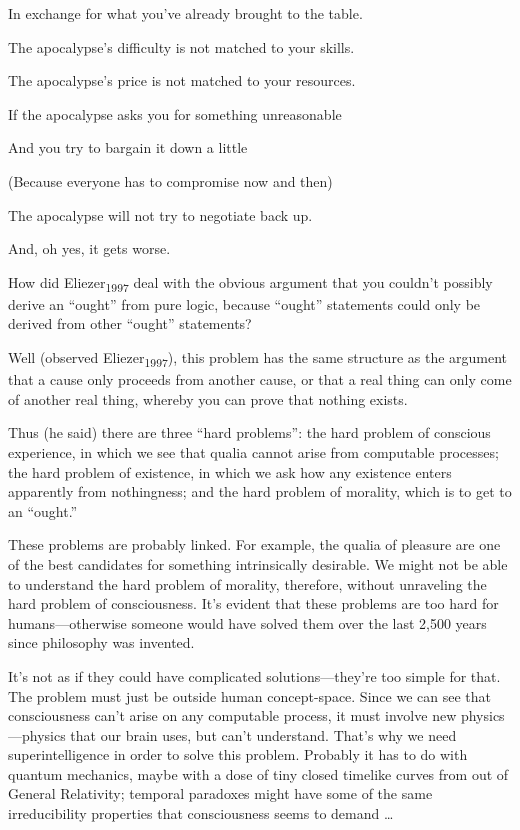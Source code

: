 {
 In exchange for what you've already brought to the
table.}

{
 The apocalypse's difficulty is not matched to your
skills.}

{
 The apocalypse's price is not matched to your
resources.}

{
 If the apocalypse asks you for something unreasonable}

{
 And you try to bargain it down a little}

{
 (Because everyone has to compromise now and then)}

{
 The apocalypse will not try to negotiate back up.}

{
 And, oh yes, it gets worse.}

{
 How did Eliezer\textsubscript{1997} deal with the obvious argument
that you couldn't possibly derive an
``ought'' from pure logic, because
``ought'' statements could only be
derived from other ``ought''
statements?}

{
 Well (observed Eliezer\textsubscript{1997}), this problem has the
same structure as the argument that a cause only proceeds from another
cause, or that a real thing can only come of another real thing,
whereby you can prove that nothing exists.}

{
 Thus (he said) there are three ``hard
problems'': the hard problem of conscious experience,
in which we see that qualia cannot arise from computable processes; the
hard problem of existence, in which we ask how any existence enters
apparently from nothingness; and the hard problem of morality, which is
to get to an ``ought.''}

{
 These problems are probably linked. For example, the qualia of
pleasure are one of the best candidates for something intrinsically
desirable. We might not be able to understand the hard problem of
morality, therefore, without unraveling the hard problem of
consciousness. It's evident that these problems are too
hard for humans---otherwise someone would have solved them over the
last 2,500 years since philosophy was invented.}

{
 It's not as if they could have complicated
solutions---they're too simple for that. The problem
must just be outside human concept-space. Since we can see that
consciousness can't arise on any computable process, it
must involve new physics---physics that our brain uses, but
can't understand. That's why we need
superintelligence in order to solve this problem. Probably it has to do
with quantum mechanics, maybe with a dose of tiny closed timelike
curves from out of General Relativity; temporal paradoxes might have
some of the same irreducibility properties that consciousness seems to
demand \ldots}

